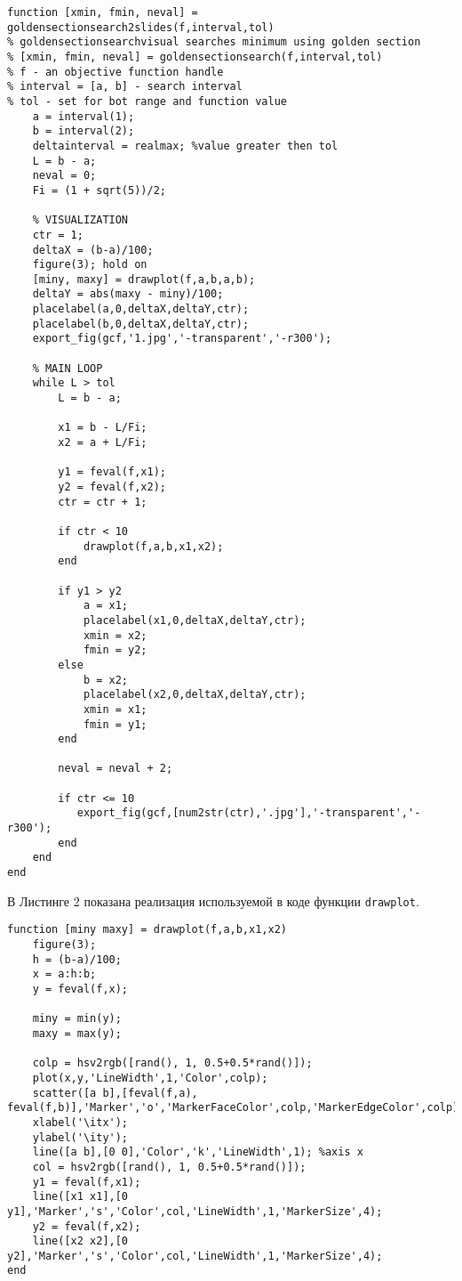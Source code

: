 \documentclass[a4paper,12pt]{article}
\begin{document}
\newpage
\begin{lstlisting}[style=Matlab-editor, caption=Метод золотого сечения с визуализацией] 
function [xmin, fmin, neval] = goldensectionsearch2slides(f,interval,tol)
% goldensectionsearchvisual searches minimum using golden section
% [xmin, fmin, neval] = goldensectionsearch(f,interval,tol)
% f - an objective function handle
% interval = [a, b] - search interval
% tol - set for bot range and function value
    a = interval(1);
    b = interval(2);
    deltainterval = realmax; %value greater then tol
    L = b - a;
    neval = 0;
    Fi = (1 + sqrt(5))/2;
 
    % VISUALIZATION
    ctr = 1;
    deltaX = (b-a)/100;
    figure(3); hold on
    [miny, maxy] = drawplot(f,a,b,a,b);
    deltaY = abs(maxy - miny)/100;
    placelabel(a,0,deltaX,deltaY,ctr);
    placelabel(b,0,deltaX,deltaY,ctr);
    export_fig(gcf,'1.jpg','-transparent','-r300');
    
    % MAIN LOOP
    while L > tol
        L = b - a;
        
        x1 = b - L/Fi; 
        x2 = a + L/Fi;
        
        y1 = feval(f,x1);
        y2 = feval(f,x2);
        ctr = ctr + 1;
        
        if ctr < 10
            drawplot(f,a,b,x1,x2);
        end
        
        if y1 > y2
            a = x1;
            placelabel(x1,0,deltaX,deltaY,ctr);
            xmin = x2;
            fmin = y2;
        else
            b = x2;
            placelabel(x2,0,deltaX,deltaY,ctr);
            xmin = x1;
            fmin = y1;
        end
        
        neval = neval + 2;
        
        if ctr <= 10
           export_fig(gcf,[num2str(ctr),'.jpg'],'-transparent','-r300');
        end
    end
end
\end{lstlisting}

В Листинге 2 показана реализация используемой в коде функции \lstinline[style=Matlab-editor]{drawplot}.

\begin{lstlisting}[style=Matlab-editor, caption=Функция рисования графика] 
function [miny maxy] = drawplot(f,a,b,x1,x2)
    figure(3); 
    h = (b-a)/100;
    x = a:h:b;
    y = feval(f,x);
    
    miny = min(y);
    maxy = max(y);
    
    colp = hsv2rgb([rand(), 1, 0.5+0.5*rand()]);
    plot(x,y,'LineWidth',1,'Color',colp);
    scatter([a b],[feval(f,a), feval(f,b)],'Marker','o','MarkerFaceColor',colp,'MarkerEdgeColor',colp);
    xlabel('\itx');
    ylabel('\ity');
    line([a b],[0 0],'Color','k','LineWidth',1); %axis x
    col = hsv2rgb([rand(), 1, 0.5+0.5*rand()]);
    y1 = feval(f,x1);
    line([x1 x1],[0 y1],'Marker','s','Color',col,'LineWidth',1,'MarkerSize',4); 
    y2 = feval(f,x2);
    line([x2 x2],[0 y2],'Marker','s','Color',col,'LineWidth',1,'MarkerSize',4); 
end
\end{lstlisting}
\end{document}
